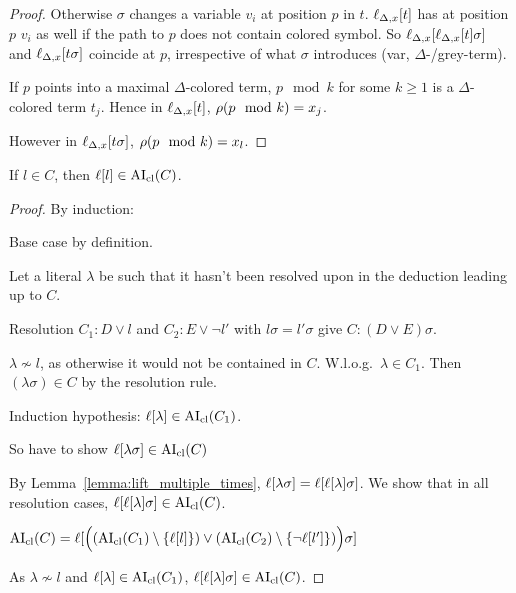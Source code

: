 \documentclass[,%
	paper=a4,%
	DIV20, 
	liststotoc,
	bibtotoc,
	draft=false,%
	numbers=noendperiod
]{scrartcl}
\begin{document}
\begin{proof}
{  Otherwise $\sigma$ changes a variable $v_i$ at position $p$ in $t$.
  $\ell_{\Delta,x}[t]$ has at position $p$ $v_i$ as well if the path to $p$ does not contain colored symbol.
  So $\ell_{\Delta,x}[\ell_{\Delta,x}[t]\sigma]$ and $\ell_{\Delta,x}[t\sigma]$ coincide at $p$, irrespective of what $\sigma$ introduces (var,   $\Delta$-/grey-term).

  If $p$ points into a maximal $\Delta$-colored term, $p\mod k$ for some $k\geq 1$ is a $\Delta$-colored term $t_j$.
  Hence in $\ell_{\Delta,x}[t]$, $\operatorname{{\rho}}(p\mod k) = x_j$.

  However in $\ell_{\Delta,x}[t\sigma]$, $\operatorname{{\rho}}(p\mod k) = x_l$.
}
\end{proof}

\begin{lemma}

  If $l \in C$, then $\ell[l] \in \operatorname{AI}_\mathrm{cl}(C)$.
  \label{lemma:literals_in_aiclause}
\end{lemma}
\begin{proof} By induction:

  Base case by definition.

  Let a literal $\lambda$ be such that it hasn't been resolved upon in the deduction leading up to $C$.

  Resolution $C_1 : D \lor l$ and $C_2 : E \lor \lnot l'$ with $l\sigma = l'\sigma$ give $C: (D\lor E)\sigma$.

  $\lambda \not\sim l$, as otherwise it would not be contained in $C$.
  W.l.o.g.\ $\lambda \in C_1$.
  Then $(\lambda\sigma) \in C$ by the resolution rule.

  Induction hypothesis: $\ell[\lambda] \in \operatorname{AI}_\mathrm{cl}(C_1)$.

  So have to show $ \ell[\lambda\sigma] \in \operatorname{AI}_\mathrm{cl}(C)$ 

  By Lemma~\ref{lemma:lift_multiple_times},
  $\ell[\lambda\sigma] = \ell[\ell[\lambda]\sigma]$.
  We show that in all resolution cases, $\ell[\ell[\lambda] \sigma] \in \operatorname{AI}_\mathrm{cl}(C)$.

      $\operatorname{AI}_\mathrm{cl}(C) = \ell[ \Big( (\operatorname{AI}_\mathrm{cl}(C_1) \setminus \{\ell[l]\}) \lor (\operatorname{AI}_\mathrm{cl}(C_2) \setminus \{\lnot         \ell[l']\}) \Big) \sigma] $

      As $\lambda \not\sim l$ and $\ell[\lambda] \in \operatorname{AI}_\mathrm{cl}(C_1)$, $\ell[\ell[\lambda] \sigma] \in \operatorname{AI}_\mathrm{cl}(C)  $.
\end{proof}
\end{document}
